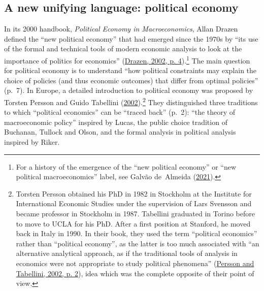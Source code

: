 \documentclass[
  12pt,
  onecolumn]{article}
\begin{document}
\hypertarget{political-economics}{%
\subsection{A new unifying language: political
economy}\label{political-economics}}

In its 2000 handbook, \emph{Political Economy in Macroeconomics}, Allan
Drazen defined the ``new political economy'' that had emerged since the
1970s by ``its use of the formal and technical tools of modern economic
analysis to look at the importance of politics for economics''
(\protect\hyperlink{ref-drazen2002}{Drazen, 2002, p. 4}).\footnote{For a
  history of the emergence of the ``new political economy'' or ``new
  political macroeconomics'' label, see Galvão de~Almeida
  (\protect\hyperlink{ref-galvaodealmeida2021}{2021}).} The main
question for political economy is to understand ``how political
constraints may explain the choice of policies (and thus economic
outcomes) that differ from optimal policies'' (p.~7). In Europe, a
detailed introduction to political economy was proposed by Torsten
Persson and Guido Tabellini
(\protect\hyperlink{ref-persson2002}{2002}).\footnote{Torsten Persson
  obtained his PhD in 1982 in Stockholm at the Institute for
  International Economic Studies under the supervision of Lars Svensson
  and became professor in Stockholm in 1987. Tabellini graduated in
  Torino before to move to UCLA for his PhD. After a first position at
  Stanford, he moved back in Italy in 1990. In their book, they used the
  term ``political economics'' rather than ``political economy'', as the
  latter is too much associated with ``an alternative analytical
  approach, as if the traditional tools of analysis in economics were
  not appropriate to study political phenomena''
  (\protect\hyperlink{ref-persson2002}{Persson and Tabellini, 2002, p.
  2}), idea which was the complete opposite of their point of view.}
They distinguished three traditions to which ``political economics'' can
be ``traced back'' (p.~2): ``the theory of macroeconomic policy''
inspired by Lucas, the public choice tradition of Buchanan, Tullock and
Olson, and the formal analysis in political analysis inspired by Riker.
\end{document}
